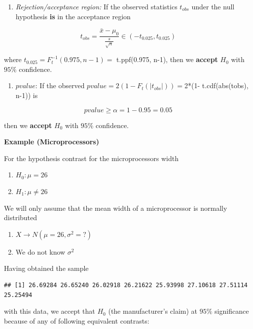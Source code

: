 \documentclass[
]{book}
\providecommand{\tightlist}{%
  \setlength{\itemsep}{0pt}\setlength{\parskip}{0pt}}
\begin{document}
\begin{enumerate}
\def\labelenumi{\arabic{enumi}.}
\setcounter{enumi}{1}
\tightlist
\item
  \emph{Rejection/acceptance region:} If the observed statistics \(t_{obs}\) under the null hypothesis \textbf{is} in the acceptance region
\end{enumerate}

\[t_{obs}=\frac{\bar{x}-\mu_0}{\frac{s}{\sqrt{n}}} \in (-t_{0.025}, t_{0.025})\]

where \(t_{0.025}=F_t^{-1}(0.975, n-1)=\) t.ppf(0.975, n-1), then we \textbf{accept} \(H_0\) with \(95\%\) confidence.

\begin{enumerate}
\def\labelenumi{\arabic{enumi}.}
\setcounter{enumi}{2}
\tightlist
\item
  \(pvalue\): If the observed \(pvalue= 2 (1-F_t(|t_{obs}|))=\)2*(1- t.cdf(abs(tobs), n-1)) is
\end{enumerate}

\[pvalue \geq \alpha =1-0.95=0.05\]

then we \textbf{accept} \(H_0\) with \(95\%\) confidence.

\textbf{Example (Microprocessors)}

For the hypothesis contrast for the microprocessors width

\begin{enumerate}
\def\labelenumi{\alph{enumi}.}
\tightlist
\item
  \(H_0:\mu = 26\)
\item
  \(H_1:\mu \neq 26\)
\end{enumerate}

We will only assume that the mean width of a microprocessor is normally distributed

\begin{enumerate}
\def\labelenumi{\arabic{enumi}.}
\tightlist
\item
  \(X \rightarrow N(\mu=26, \sigma^2=?)\)
\item
  We do not know \(\sigma^2\)
\end{enumerate}

Having obtained the sample

\begin{verbatim}
## [1] 26.69284 26.65240 26.02918 26.21622 25.93998 27.10618 27.51114 25.25494
\end{verbatim}

with this data, we accept that \(H_0\) (the manufacturer's claim) at \(95\%\) significance because of any of following equivalent contrasts:
\end{document}
